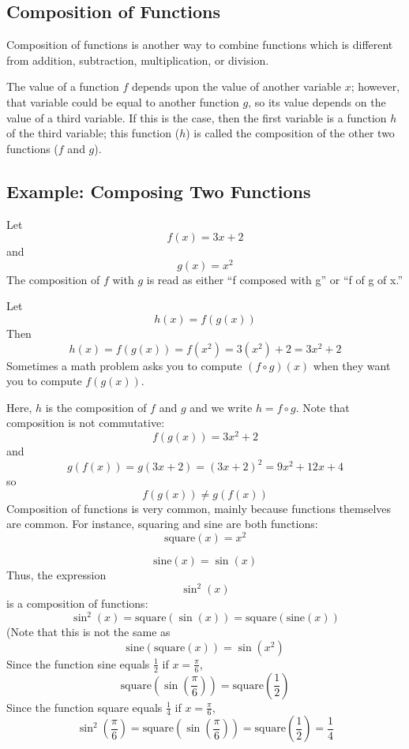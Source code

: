 \subsection{Composition of Functions}
\label{sss:comp-37f3}

Composition of functions is another way to combine functions which is different from
addition, subtraction, multiplication, or division.

The value of a function $f$ depends upon the value of another variable $x$; however, that variable could be equal to another function $g$, so its value depends on the value of a third variable. If this is the case, then the first variable is a function $h$ of the third variable; this function ($h$) is called the composition of the other two functions ($f$ and $g$).

\subsection{Example: Composing Two Functions}
\label{sss:exam-d4fc}

Let
\[
f(x) = 3x + 2
\]
and
\[
g(x) = x^2
\]
The composition of $f$ with $g$ is read as either ``f composed with g'' or ``f of g of x.''

Let
\[
h(x) = f(g(x))
\]
Then
\[
h(x) = f(g(x)) = f(x^2) = 3(x^2) + 2 = 3x^2 + 2
\]
Sometimes a math problem asks you to compute $(f \circ g)(x)$ when they want you to compute $f(g(x))$.

Here, $h$ is the composition of $f$ and $g$ and we write $h = f \circ g$. Note that composition is not commutative:
\[
f(g(x)) = 3x^2 + 2
\]
and
\[
g(f(x)) = g(3x + 2) = (3x + 2)^2 = 9x^2 + 12x + 4
\]
so
\[
f(g(x)) \neq g(f(x))
\]
Composition of functions is very common, mainly because functions themselves are common.
For instance, squaring and sine are both functions:
\[
\text{square}(x) = x^2
\]

\[
\text{sine}(x) = \sin(x)
\]
Thus, the expression
\[
\sin^2(x)
\] 
is a composition of functions:
\[
\sin^2(x) = \text{square}(\sin(x)) = \text{square}(\text{sine}(x))
\]
(Note that this is not the same as
\[
\text{sine}(\text{square}(x)) = \sin(x^2)
\]
Since the function sine equals $\frac{1}{2}$ if $x = \frac{\pi}{6}$,
\[
\text{square}(\sin(\frac{\pi}{6})) = \text{square}(\frac{1}{2})
\]
Since the function square equals $\frac{1}{4}$ if $x = \frac{\pi}{6}$,
\[
\sin^2(\frac{\pi}{6}) = \text{square}(\sin(\frac{\pi}{6})) = \text{square}(\frac{1}{2}) = \frac{1}{4}
\]

